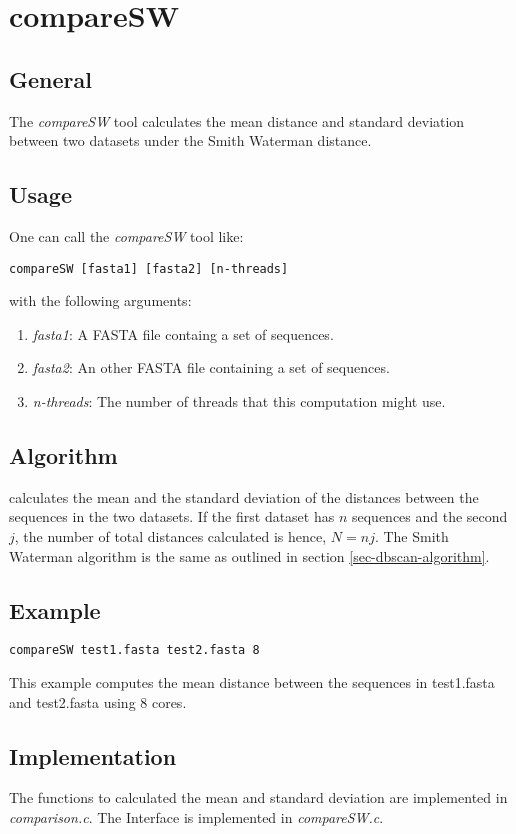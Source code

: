 \section{compareSW}

\subsection{General}

The \emph{compareSW} tool calculates the mean distance and standard deviation
between two datasets under the Smith Waterman distance.

\subsection{Usage}

One can call the \emph{compareSW} tool like:
\begin{lstlisting}
compareSW [fasta1] [fasta2] [n-threads]
\end{lstlisting}
with the following arguments:
\begin{enumerate}
\item \emph{fasta1}: A FASTA file containg a set of sequences.
\item \emph{fasta2}: An other FASTA file containing a set of sequences.
\item \emph{n-threads}: The number of threads that this computation might use.
\end{enumerate}

\subsection{Algorithm}

calculates the mean and the standard deviation of the distances
between the sequences in the two datasets. If the first dataset has
$n$ sequences and the second $j$, the number of total distances
calculated is hence, $N=nj$. The Smith Waterman algorithm is the same
as outlined in section \ref{sec-dbscan-algorithm}. 

\subsection{Example}
\begin{lstlisting}
compareSW test1.fasta test2.fasta 8
\end{lstlisting}
This example computes the mean distance between the sequences in test1.fasta
and test2.fasta using 8 cores. 

\subsection{Implementation}
The functions to calculated the mean and standard deviation are
implemented in \emph{comparison.c}. The Interface is implemented in
\emph{compareSW.c}.

